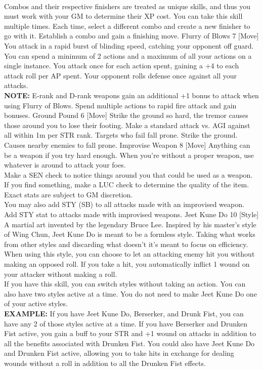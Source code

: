 \begin{path}
{\\Combos and their respective finishers are treated as unique skills, and thus you must work with your GM to determine their XP cost. You can take this skill multiple times. Each time, select a different combo and create a new finisher to go with it.}
{Establish a combo and gain a finishing move.}
\skilldescription
{Flurry of Blows}
{7}
[Move]
{You attack in a rapid burst of blinding speed, catching your opponent off guard. You can spend a minimum of 2 actions and a maximum of all your actions on a single instance. You attack once for each action spent, gaining a +4 to each attack roll per AP spent. Your opponent rolls defense once against all your attacks.
\\\textbf{NOTE:} E-rank and D-rank weapons gain an additional +1 bonus to attack when using Flurry of Blows.}
{Spend multiple actions to rapid fire attack and gain bonuses.}
\skilldescription
{Ground Pound}
{6}
[Move]
{Strike the ground so hard, the tremor causes those around you to lose their footing. Make a standard attack vs. AGI against all within 1m per STR rank. Targets who fail fall prone.}
{Strike the ground. Causes nearby enemies to fall prone.}
\skilldescription
{Improvise Weapon}
{8}
[Move]
{Anything can be a weapon if you try hard enough. When you're without a proper weapon, use whatever is around to attack your foes.
\\Make a SEN check to notice things around you that could be used as a weapon. If you find something, make a LUC check to determine the quality of the item. Exact stats are subject to GM discretion.
\\You may also add STY (SB) to all attacks made with an improvised weapon.}
{Add STY stat to attacks made with improvised weapons.}
\skilldescription
{Jeet Kune Do}
{10}
[Style]
{A martial art invented by the legendary Bruce Lee. Inspired by his master's style of Wing Chun, Jeet Kune Do is meant to be a formless style. Taking what works from other styles and discarding what doesn't it's meant to focus on efficiency.
\\When using this style, you can choose to let an attacking enemy hit you without making an opposed roll. If you take a hit, you automatically inflict 1 wound on your attacker without making a roll.
\\If you have this skill, you can switch styles without taking an action. You can also have two styles active at a time. You do not need to make Jeet Kune Do one of your active styles.
\\\textbf{EXAMPLE:} If you have Jeet Kune Do, Berserker, and Drunk Fist, you can have any 2 of those styles active at a time. If you have Berserker and Drunken Fist active, you gain a buff to your STR and +1 wound on attacks in addition to all the benefits associated with Drunken Fist. You could also have Jeet Kune Do and Drunken Fist active, allowing you to take hits in exchange for dealing wounds without a roll in addition to all the Drunken Fist effects.}

\end{path}
